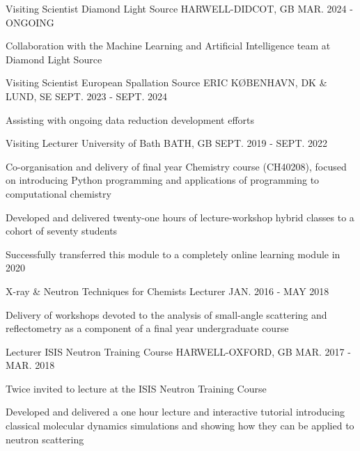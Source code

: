 \begin{cventries}
	\cventry
	{Visiting Scientist}
	{Diamond Light Source}
	{HARWELL-DIDCOT, GB}
	{MAR. 2024 - ONGOING}
	{
		\begin{cvitems}
			\item {Collaboration with the Machine Learning and Artificial Intelligence team at Diamond Light Source}
		\end{cvitems}
	}
	\cventry
	{Visiting Scientist}
	{European Spallation Source ERIC}
	{K\O BENHAVN, DK \& LUND, SE}
	{SEPT. 2023 - SEPT. 2024}
	{
		\begin{cvitems}
			\item {Assisting with ongoing data reduction development efforts}
		\end{cvitems}
	}
	\cventry
	{Visiting Lecturer}
	{University of Bath}
	{BATH, GB}
	{SEPT. 2019 - SEPT. 2022}
	{
		\begin{cvitems}
			\item {Co-organisation and delivery of final year Chemistry course (CH40208), focused on introducing Python programming and applications of programming to computational chemistry}
			\item {Developed and delivered twenty-one hours of lecture-workshop hybrid classes to a cohort of seventy students}
			\item {Successfully transferred this module to a completely online learning module in 2020}
		\end{cvitems}
	}
	\cventry
	{X-ray \& Neutron Techniques for Chemists Lecturer}
	{}
	{}
	{JAN. 2016 - MAY 2018}
	{
		\begin{cvitems}
			\item {Delivery of workshops devoted to the analysis of small-angle scattering and reflectometry as a component of a final year undergraduate course}
		\end{cvitems}
	}
	\cventry
	{Lecturer}
	{ISIS Neutron Training Course}
	{HARWELL-OXFORD, GB}
	{MAR. 2017 - MAR. 2018}
	{
		\begin{cvitems}
			\item {Twice invited to lecture at the ISIS Neutron Training Course}
			\item {Developed and delivered a one hour lecture and interactive tutorial introducing classical molecular dynamics simulations and showing how they can be applied to neutron scattering}
		\end{cvitems}
	}
\end{cventries}
